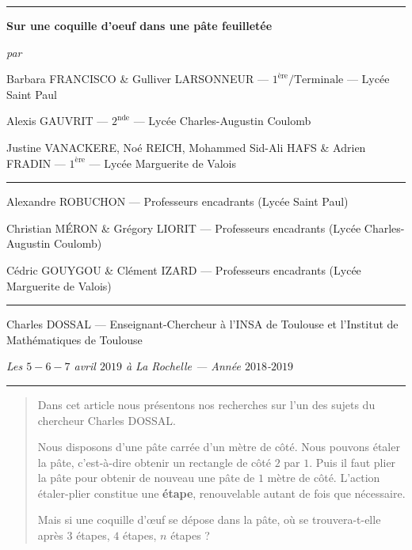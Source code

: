 \documentclass[a4paper,french,12pt]{article}
\begin{document}
\thispagestyle{empty}
\begin{center}
\rule[0.5ex]{\textwidth}{0.5mm}
\vspace*{0.5cm}

{\Large \textbf{Sur une coquille d'oeuf dans une pâte feuilletée} }
\vspace*{0.25cm}

\emph{par}
\vspace*{0.25cm}

{\scriptsize Barbara FRANCISCO \& Gulliver LARSONNEUR --- $1^{\text{ère}}/\text{Terminale}$ --- Lycée Saint Paul}

{\scriptsize Alexis GAUVRIT --- $2^{\text{nde}}$ --- Lycée Charles-Augustin Coulomb}

{\scriptsize Justine VANACKERE, Noé REICH, Mohammed Sid-Ali HAFS \& Adrien FRADIN --- $1^{\text{ère}}$ --- Lycée Marguerite de Valois}

\rule[0.5ex]{1.5cm}{0.1mm}

{\scriptsize Alexandre ROBUCHON --- Professeurs encadrants (Lycée Saint Paul)}

{\scriptsize Christian MÉRON \& Grégory LIORIT --- Professeurs encadrants (Lycée Charles-Augustin Coulomb)}

{\scriptsize Cédric GOUYGOU \& Clément IZARD --- Professeurs encadrants (Lycée Marguerite de Valois)}

\rule[0.5ex]{1.5cm}{0.1mm}

{\scriptsize Charles DOSSAL --- Enseignant-Chercheur à l'INSA de Toulouse et l’Institut de Mathématiques de Toulouse}

\vspace*{0.5cm}
\emph{Les $5-6-7$ avril $2019$ à La Rochelle --- Année $2018$-$2019$}

\vspace*{0.5cm}
\rule[0.5ex]{7cm}{0.5mm}
\vspace*{0.5cm}

\end{center}


\begin{abstract}
Dans cet article nous présentons nos recherches sur l'un des sujets du chercheur Charles DOSSAL. 

Nous disposons d'une pâte carrée d'un mètre de côté. Nous pouvons étaler la pâte, c'est-à-dire obtenir un rectangle de côté $2$ par $1$. Puis il faut plier la pâte pour obtenir de nouveau une pâte de $1$ mètre de côté. L'action étaler-plier constitue une \textbf{étape}, renouvelable autant de fois que nécessaire.

Mais si une coquille d'œuf se dépose dans la pâte, où se trouvera-t-elle après $3$ étapes, $4$ étapes, $n$ étapes ?
\end{abstract}
\end{document}
